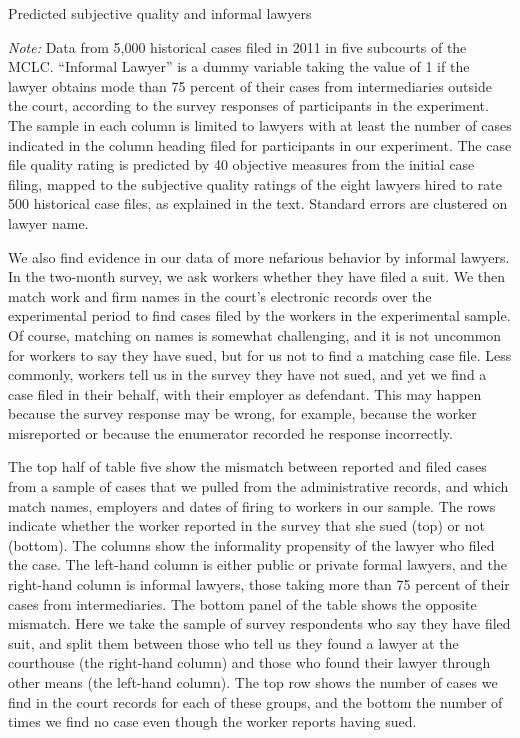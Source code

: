 \documentclass[12 pt]{article}
\newenvironment{figurenotes}[1][\footnotesize{Note}]{\begin{minipage}[t]{\linewidth}\footnotesize{\itshape#1: }}{\end{minipage}}
\begin{document}


\begin{table}[!ht]
    \caption{Predicted subjective quality and informal lawyers} %
    \label{tab:4}
    \center
    \notesize{}
    \begin{figurenotes}
    Data from 5,000 historical cases filed in 2011 in five subcourts of the MCLC. “Informal Lawyer” is a dummy variable taking the value of 1 if the lawyer obtains mode than 75 percent of their cases from intermediaries outside the court, according to the survey responses of participants in the experiment. The sample in each column is limited to lawyers with at least the number of cases indicated in the column heading filed for participants in our experiment. The case file quality rating is predicted by 40 objective measures from the initial case filing, mapped to the subjective quality ratings of the eight lawyers hired to rate 500 historical case files, as explained in the text. Standard errors are clustered on lawyer name.
    \end{figurenotes}
  
\end{table}

We also find evidence in our data of more nefarious behavior by informal lawyers. In the two-month survey, we ask workers whether they have filed a suit. We then match work and firm names in the court’s electronic records over the experimental period to find cases filed by the workers in the experimental sample. Of course, matching on names is somewhat challenging, and it is not uncommon for workers to say they have sued, but for us not to find a matching case file. Less commonly, workers tell us in the survey they have not sued, and yet we find a case filed in their behalf, with their employer as defendant. This may happen because the survey response may be wrong, for example, because the worker misreported or because the enumerator recorded he response incorrectly. 

The top half of table five show the mismatch between reported and filed cases from a sample of cases that we pulled from the administrative records, and which match names, employers and dates of firing to workers in our sample. The rows indicate whether the worker reported in the survey that she sued (top) or not (bottom). The columns show the informality propensity of the lawyer who filed the case. The left-hand column is either public or private formal lawyers, and the right-hand column is informal lawyers, those taking more than 75 percent of their cases from intermediaries. The bottom panel of the table shows the opposite mismatch. Here we take the sample of survey respondents who say they have filed suit, and split them between those who tell us they found a lawyer at the courthouse (the right-hand column) and those who found their lawyer through other means (the left-hand column). The top row shows the number of cases we find in the court records for each of these groups, and the bottom the number of times we find no case even though the worker reports having sued. 
\end{document}
